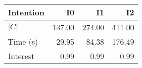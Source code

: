 \begin{tabular}{lrrr}
\toprule
Intention & I0 & I1 & I2 \\
\midrule
$|C|$ & 137.00 & 274.00 & 411.00 \\
Time (s) & 29.95 & 84.38 & 176.49 \\
Interest & 0.99 & 0.99 & 0.99 \\
\bottomrule
\end{tabular}
